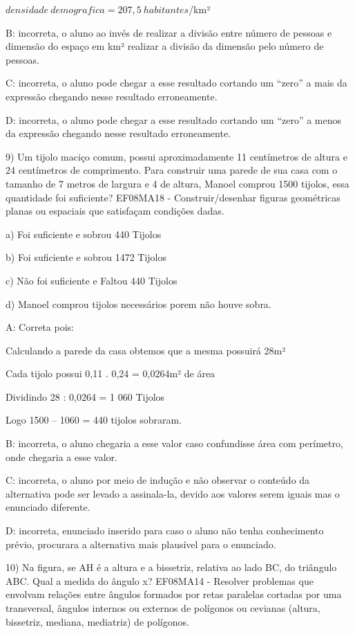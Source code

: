 \(densidade\ demografica = 207,5\ habitantes\)/km²

B: incorreta, o aluno ao invés de realizar a divisão entre número de
pessoas e dimensão do espaço em km² realizar a divisão da dimensão pelo
número de pessoas.

C: incorreta, o aluno pode chegar a esse resultado cortando um ``zero''
a mais da expressão chegando nesse resultado erroneamente.

D: incorreta, o aluno pode chegar a esse resultado cortando um ``zero''
a menos da expressão chegando nesse resultado erroneamente.

9) Um tijolo maciço comum, possui aproximadamente 11 centímetros de
altura e 24 centímetros de comprimento. Para construir uma parede de sua
casa com o tamanho de 7 metros de largura e 4 de altura, Manoel comprou
1500 tijolos, essa quantidade foi suficiente? EF08MA18 -
Construir/desenhar figuras geométricas planas ou espaciais que
satisfaçam condições dadas.

a) Foi suficiente e sobrou 440 Tijolos

b) Foi suficiente e sobrou 1472 Tijolos

c) Não foi suficiente e Faltou 440 Tijolos

d) Manoel comprou tijolos necessários porem não houve sobra.

A: Correta pois:

Calculando a parede da casa obtemos que a mesma possuirá 28m²

Cada tijolo possui 0,11 . 0,24 = 0,0264m² de área

Dividindo 28 : 0,0264 = 1 060 Tijolos

Logo 1500 -- 1060 = 440 tijolos sobraram.

B: incorreta, o aluno chegaria a esse valor caso confundisse área com
perímetro, onde chegaria a esse valor.

C: incorreta, o aluno por meio de indução e não observar o conteúdo da
alternativa pode ser levado a assinala-la, devido aos valores serem
iguais mas o enunciado diferente.

D: incorreta, enunciado inserido para caso o aluno não tenha
conhecimento prévio, procurara a alternativa mais plausível para o
enunciado.

10) Na figura, se AH é a altura e a bissetriz, relativa ao lado BC, do
triângulo ABC. Qual a medida do ângulo x? EF08MA14 - Resolver problemas
que envolvam relações entre ângulos formados por retas paralelas
cortadas por uma transversal, ângulos internos ou externos de polígonos
ou cevianas (altura, bissetriz, mediana, mediatriz) de polígonos.

